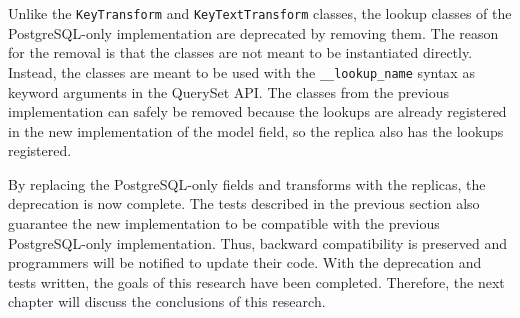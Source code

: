 Unlike the \verb|KeyTransform| and \verb|KeyTextTransform| classes, the lookup
classes of the PostgreSQL-only implementation are deprecated by removing them.
The reason for the removal is that the classes are not meant to be instantiated
directly. Instead, the classes are meant to be used with the
\verb|__lookup_name| syntax as keyword arguments in the QuerySet API. The
classes from the previous implementation can safely be removed because the
lookups are already registered in the new implementation of the model field, so
the replica also has the lookups registered.

By replacing the PostgreSQL-only fields and transforms with the replicas, the
deprecation is now complete. The tests described in the previous section also
guarantee the new implementation to be compatible with the previous
PostgreSQL-only implementation. Thus, backward compatibility is preserved and
programmers will be notified to update their code. With the deprecation and
tests written, the goals of this research have been completed. Therefore, the
next chapter will discuss the conclusions of this research.
